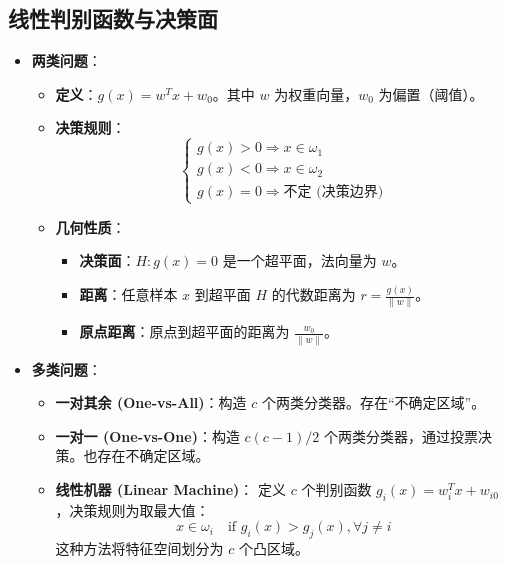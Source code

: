 \documentclass[a4paper, 11pt]{ctexart}
\begin{document}
\subsection{线性判别函数与决策面}
\begin{itemize}
    \item \textbf{两类问题}：
    \begin{itemize}
        \item \textbf{定义}：$g(x) = w^T x + w_0$。其中 $w$ 为权重向量，$w_0$ 为偏置（阈值）。
        \item \textbf{决策规则}：
        \begin{equation}
            \begin{cases}
            g(x) > 0 \Rightarrow x \in \omega_1 \\
            g(x) < 0 \Rightarrow x \in \omega_2 \\
            g(x) = 0 \Rightarrow \text{不定 (决策边界)}
            \end{cases}
        \end{equation}
        \item \textbf{几何性质}：
        \begin{itemize}
            \item \textbf{决策面}：$H: g(x) = 0$ 是一个超平面，法向量为 $w$。
            \item \textbf{距离}：任意样本 $x$ 到超平面 $H$ 的代数距离为 $r = \frac{g(x)}{\|w\|}$。
            \item \textbf{原点距离}：原点到超平面的距离为 $\frac{w_0}{\|w\|}$。
        \end{itemize}
    \end{itemize}
    
    \item \textbf{多类问题}：
    \begin{itemize}
        \item \textbf{一对其余 (One-vs-All)}：构造 $c$ 个两类分类器。存在“不确定区域”。
        \item \textbf{一对一 (One-vs-One)}：构造 $c(c-1)/2$ 个两类分类器，通过投票决策。也存在不确定区域。
        \item \textbf{线性机器 (Linear Machine)}：
        定义 $c$ 个判别函数 $g_i(x) = w_i^T x + w_{i0}$，决策规则为取最大值：
        \[ x \in \omega_i \quad \text{if } g_i(x) > g_j(x), \forall j \neq i \]
        这种方法将特征空间划分为 $c$ 个凸区域。
    \end{itemize}
\end{itemize}
\end{document}
